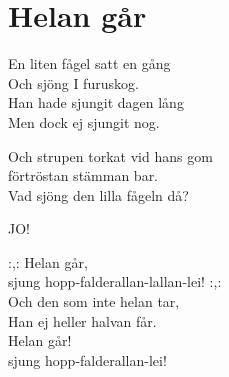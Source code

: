 \section{Helan går}

En liten fågel satt en gång\\
Och sjöng I furuskog.\\
Han hade sjungit dagen lång\\
Men dock ej sjungit nog.

Och strupen torkat vid hans gom\\
förtröstan stämman bar.\\
Vad sjöng den lilla fågeln då?

JO!

:,: Helan går,\\
sjung hopp-falderallan-lallan-lei! :,:\\
Och den som inte helan tar,\\
Han ej heller halvan får.\\
Helan går!\\
sjung hopp-falderallan-lei!
